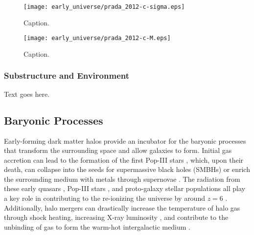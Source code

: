 \begin{figure}[ht]
	\centering
	\texttt{[image: early\_universe/prada\_2012-c-sigma.eps]}
	\caption[Caption]{\footnotesize Caption.}
	\label{fig:concentration--prada_c_sigma}
\end{figure}

\begin{figure}[ht]
	\centering
	\texttt{[image: early\_universe/prada\_2012-c-M.eps]}
	\caption[Caption]{\footnotesize Caption.}
	\label{fig:concentration--prada_c_M}
\end{figure}



\subsubsection{Substructure and Environment}
\label{subsubsec:early_universe--halo_properties--structure}


Text goes here.




\subsection{Baryonic Processes}
\label{subsec:early_universe--baryonic_processes}


Early-forming dark matter halos provide an incubator for the baryonic processes that transform the surrounding space and allow galaxies to form.  Initial gas accretion can lead to the formation of the first Pop-III stars \citep{1986MNRAS.221...53C, 1997ApJ...474....1T, 2000ApJ...540...39A, 2002Sci...295...93A}, which, upon their death, can collapse into the seeds for supermassive black holes (SMBHs) \citep{2001ApJ...551L..27M, 2003MNRAS.340..647I, 2009ApJ...701L.133A, 2012ApJ...754...34J} or enrich the surrounding medium with metals through supernovae \citep{2002ApJ...567..532H, 2003ApJ...591..288H}.  The radiation from these early quasars \citep{1987ApJ...321L.107S, 1999ApJ...514..648M, 2001AJ....122.2833F}, Pop-III stars \citep{1997ApJ...486..581G, 2003ApJ...584..621V, 2006ApJ...639..621A}, and proto-galaxy stellar populations \citep{2012ApJ...752L...5B, 2012MNRAS.423..862K} all play a key role in contributing to the re-ionizing the universe by around $z = 6$ \citep{2001PhR...349..125B}.  Additionally, halo mergers can drastically increase the temperature of halo gas through shock heating, increasing X-ray luminosity \citep{2009MNRAS.397..190S}, and contribute to the unbinding of gas to form the warm-hot intergalactic medium \citep{2008SSRv..134..141B, 2010MNRAS.405L..31S, 2012MNRAS.425.2974T}.



